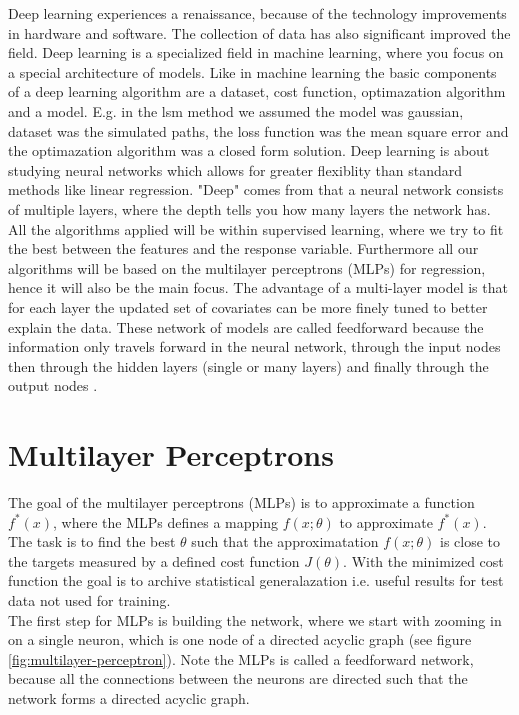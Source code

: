 Deep learning experiences a renaissance, because of the technology improvements in hardware and software. The collection of data has also significant improved the field. Deep learning is a specialized field in machine learning, where you focus on a special architecture of models. Like in machine learning the basic components of a deep learning algorithm are a dataset, cost function, optimazation algorithm and a model. E.g. in the lsm method we assumed the model was gaussian, dataset was the simulated paths, the loss function was the mean square error and the optimazation algorithm was a closed form solution. Deep learning is about studying neural networks which allows for greater flexiblity than standard methods like linear regression. "Deep" comes from that a neural network consists of multiple layers, where the depth tells you how many layers the network has. All the algorithms applied will be within supervised learning, where we try to fit the best between the features and the response variable. Furthermore all our algorithms will be based on the multilayer perceptrons (MLPs) for regression, hence it will also be the main focus. The advantage of a multi-layer model is that for each layer the updated set of covariates can be more finely tuned to better explain the data. These network of models are called feedforward because the information only travels forward in the neural network, through the input nodes then through the hidden layers (single or many layers) and finally through the output nodes \parencite{Goodfellow-et-al-2016}. 


\section{Multilayer Perceptrons}\label{multilayerPerceptron}
The goal of the multilayer perceptrons (MLPs) is to approximate a function $f^*(x)$, where the MLPs defines a mapping $f(x;\theta)$ to approximate $f^*(x)$. The task is to find the best $\theta$ such that the approximatation $f(x;\theta)$ is close to the targets measured by a defined cost function $J(\theta)$. With the minimized cost function the goal is to archive statistical generalazation i.e. useful results for test data not used for training. \\

The first step for MLPs is building the network, where we start with zooming in on a single neuron, which is one node of a directed acyclic graph (see figure \ref{fig:multilayer-perceptron}). Note the MLPs is called a feedforward network, because all the connections between the neurons are directed such that the network forms a directed acyclic graph.

